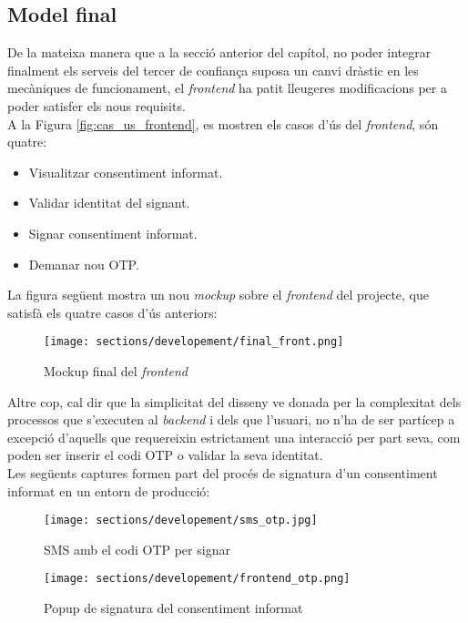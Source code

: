 \subsection{Model final}
De la mateixa manera que a la secció anterior del capítol, no poder integrar finalment els serveis del tercer de confiança suposa un canvi dràstic en les mecàniques de funcionament, el \textit{frontend} ha patit lleugeres modificacions per a poder satisfer els nous requisits.\\
\newline A la Figura \ref{fig:cas_us_frontend}, es mostren els casos d'ús del \textit{frontend}, són quatre:
\begin{itemize}
    \item Visualitzar consentiment informat.
    \item Validar identitat del signant.
    \item Signar consentiment informat.
    \item Demanar nou OTP.
\end{itemize}
La figura següent mostra un nou \textit{mockup} sobre el \textit{frontend} del projecte, que satisfà els quatre casos d'ús anteriors:
\begin{figure}[h]
\texttt{[image: sections/developement/final\_front.png]}
\centering
\caption{Mockup final del \textit{frontend}}
\label{fig:front_final}
\end{figure}
\newline Altre cop, cal dir que la simplicitat del disseny ve donada per la complexitat dels processos que s'executen al \textit{backend} i dels que l'usuari, no n'ha de ser partícep a excepció d'aquells que requereixin estrictament una interacció per part seva, com poden ser inserir el codi OTP o validar la seva identitat.\\
\clearpage
Les següents captures formen part del procés de signatura d'un consentiment informat en un entorn de producció:
\begin{figure}[h]
\texttt{[image: sections/developement/sms\_otp.jpg]}
\centering
\caption{SMS amb el codi OTP per signar}
\label{fig:sms:otp}
\end{figure}
\begin{figure}[h]
\texttt{[image: sections/developement/frontend\_otp.png]}
\centering
\caption{Popup de signatura del consentiment informat}
\label{fig:front_init}
\end{figure}





